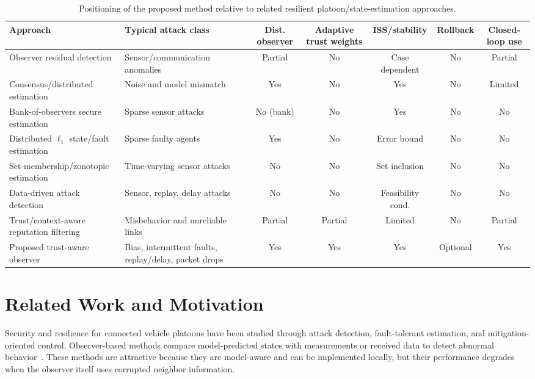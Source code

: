 \documentclass[journal,twoside]{IEEEtran}
\begin{document}
\begin{table}[!b]
\centering
\caption{Positioning of the proposed method relative to related resilient platoon/state-estimation approaches.}
\label{tab:related_comparison}
\scriptsize
\setlength{\tabcolsep}{3pt}
\renewcommand{\arraystretch}{0.94}
\begin{tabular}{p{2.7cm}p{2.7cm}ccccc}
\toprule
\textbf{Approach} & \textbf{Typical attack class} & \textbf{Dist. observer} & \textbf{Adaptive trust weights} & \textbf{ISS/stability} & \textbf{Rollback} & \textbf{Closed-loop use} \\
\midrule
Observer residual detection~\cite{jeon2020simultaneous,yamamoto2021attack,huang2022detection,2_obs_Angelo} & Sensor/communication anomalies & Partial & No & Case dependent & No & Partial \\
Consensus/distributed estimation~\cite{Guitao_multi_mesure,Consensus_discret_Saber,Plug_play} & Noise and model mismatch & Yes & No & Yes & No & Limited \\
Bank-of-observers secure estimation~\cite{chong2021secure} & Sparse sensor attacks & No (bank) & No & Yes & No & No \\
Distributed $\ell_1$ state/fault estimation~\cite{hashimoto2020distributed_l1} & Sparse faulty agents & Yes & No & Error bound & No & No \\
Set-membership/zonotopic estimation~\cite{niazi2023resilient_set} & Time-varying sensor attacks & No & No & Set inclusion & No & No \\
Data-driven attack detection~\cite{coimbatore2025data_driven_attack} & Sensor, replay, delay attacks & No & No & Feasibility cond. & No & No \\
Trust/context-aware reputation filtering~\cite{trust_physic_connecte,KF_chisquare_meusure,trust_simple,trust_complex,siddiqui2023trust_vehicles,self-belive,Enhancing_control_trust} & Misbehavior and unreliable links & Partial & Partial & Limited & No & Partial \\
Proposed trust-aware observer & Bias, intermittent faults, replay/delay, packet drops & Yes & Yes & Yes & Optional & Yes \\
\bottomrule
\end{tabular}
\end{table}

\section{Related Work and Motivation}\label{sec_related_work}
Security and resilience for connected vehicle platoons have been studied through attack detection, fault-tolerant estimation, and mitigation-oriented control. Observer-based methods compare model-predicted states with measurements or received data to detect abnormal behavior~\cite{jeon2020simultaneous,yamamoto2021attack,huang2022detection,2_obs_Angelo}. These methods are attractive because they are model-aware and can be implemented locally, but their performance degrades when the observer itself uses corrupted neighbor information.
\end{document}
